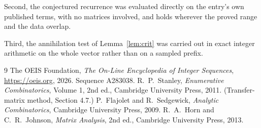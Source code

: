 \documentclass[11pt,a4paper]{article}
\theoremstyle{plain}
\theoremstyle{definition}
\begin{document}
Second, the conjectured recurrence was evaluated directly on the entry's own published terms,
with no matrices involved, and holds wherever the proved range and the data overlap.

Third, the annihilation test of Lemma~\ref{lem:crit} was carried out in exact integer
arithmetic on the whole vector rather than on a sampled prefix.

\begin{thebibliography}{9}
 The OEIS Foundation, \emph{The On-Line Encyclopedia of Integer
Sequences}, \url{https://oeis.org}, 2026. Sequence A283038.
 R.~P.~Stanley, \emph{Enumerative Combinatorics}, Volume 1, 2nd ed.,
Cambridge University Press, 2011. (Transfer-matrix method, Section 4.7.)
 P.~Flajolet and R.~Sedgewick, \emph{Analytic Combinatorics}, Cambridge
University Press, 2009.
 R.~A.~Horn and C.~R.~Johnson, \emph{Matrix Analysis}, 2nd ed., Cambridge
University Press, 2013.
\end{thebibliography}
\end{document}
